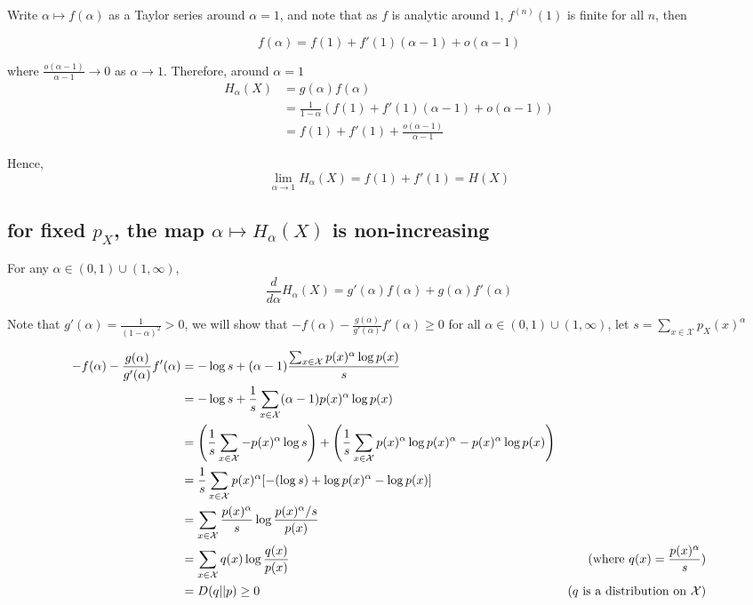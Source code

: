\documentclass{article}
\begin{document}
Write $\alpha \mapsto f(\alpha)$ as a Taylor series around $\alpha=1$, and note that as $f$ is analytic around $1$, $f^{(n)}(1)$ is finite for all $n$, then

$$
    f(\alpha) = f(1) + f'(1) (\alpha - 1) + o(\alpha - 1)
$$

where $\frac{o(\alpha - 1)}{\alpha - 1} \to 0$ as $\alpha \to 1$. Therefore, around $\alpha=1$
\begin{align*}
    H_\alpha(X)
    &= g(\alpha) f(\alpha) \\
    &= \frac{1}{1-\alpha} (f(1) + f'(1) (\alpha - 1) + o(\alpha - 1)) \\
    &= f(1) + f'(1) + \frac{o(\alpha - 1)}{\alpha - 1}
\end{align*}

Hence,
$$
    \lim_{\alpha \to 1} H_\alpha(X) = f(1) + f'(1) = H(X)
$$

\subsection{for fixed $p_X$, the map $\alpha \mapsto H_\alpha(X)$ is non-increasing}

For any $\alpha \in (0, 1) \cup (1, \infty)$,
$$
    \frac{d}{d\alpha} H_\alpha(X) = g'(\alpha) f(\alpha) + g(\alpha) f'(\alpha)
$$

Note that $g'(\alpha) = \frac{1}{(1 - \alpha)^2} > 0$, we will show that $ - f(\alpha) - \frac{g(\alpha)}{g'(\alpha)} f'(\alpha) \geq 0$ for all $\alpha \in (0, 1) \cup (1, \infty)$, let $s = \sum_{x \in \mathcal{X}} p_X(x)^\alpha$

\begin{align*}
    - f(\alpha) - \frac{g(\alpha)}{g'(\alpha)} f'(\alpha)
    &= - \log s + (\alpha - 1) \frac{\sum_{x \in \mathcal{X}} p(x)^\alpha \log p(x)}{s} \\
    &= - \log s + \frac{1}{s} \sum_{x \in \mathcal{X}} (\alpha - 1) p(x)^\alpha \log p(x) \\
    &= \tuple*{\frac{1}{s} \sum_{x \in \mathcal{X}} - p(x)^\alpha \log s} + \tuple*{\frac{1}{s} \sum_{x \in \mathcal{X}} p(x)^\alpha \log p(x)^\alpha -  p(x)^\alpha \log p(x)} \\
    &= \frac{1}{s} \sum_{x \in \mathcal{X}} p(x)^\alpha [- (\log s) + \log p(x)^\alpha - \log p(x)] \\
    &= \sum_{x \in \mathcal{X}} \frac{p(x)^\alpha}{s} \log \frac{p(x)^\alpha / s}{p(x)} \\
    &= \sum_{x \in \mathcal{X}} q(x) \log \frac{q(x)}{p(x)} &\text{(where $q(x) = \frac{p(x)^\alpha}{s}$)} \\
    &= D(q || p) \geq 0 &\text{($q$ is a distribution on $\mathcal{X}$)}
\end{align*}
\end{document}
